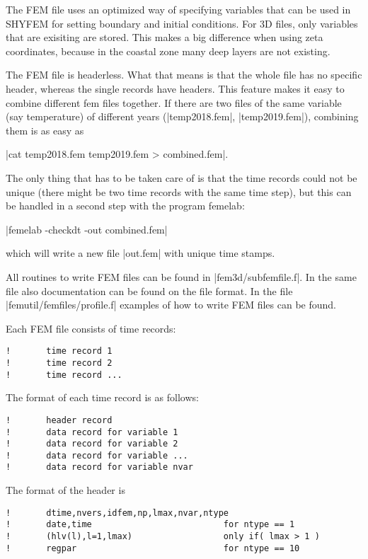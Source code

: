 The FEM file uses an optimized way of specifying variables that can be used
in SHYFEM for setting boundary and initial conditions. For 3D files, only
variables that are exisiting are stored. This makes a big difference
when using zeta coordinates, because in the coastal zone many deep
layers are not existing.

The FEM file is headerless. What that means is that the whole file
has no specific header, whereas the single records have headers. This
feature makes it easy to combine different fem files together. If there
are two files of the same variable (say temperature) of different years
(|temp2018.fem|, |temp2019.fem|), combining them is as easy as

|cat temp2018.fem temp2019.fem > combined.fem|. 

The only thing that has
to be taken care of is that the time records could not be unique (there
might be two time records with the same time step), but this
can be handled in a second step with the program femelab:

|femelab -checkdt -out combined.fem|

which will write a new file |out.fem| with unique time stamps.

All routines to write FEM files can be found in |fem3d/subfemfile.f|.
In the same file also documentation can be found on the file format.
In the file |femutil/femfiles/profile.f| examples of how to write
FEM files can be found.

Each FEM file consists of time records:

\begin{verbatim}
!       time record 1
!       time record 2
!       time record ...
\end{verbatim}

The format of each time record is as follows:

\begin{verbatim}
!       header record
!       data record for variable 1
!       data record for variable 2
!       data record for variable ...
!       data record for variable nvar
\end{verbatim}

The format of the header is

\begin{verbatim}
!       dtime,nvers,idfem,np,lmax,nvar,ntype
!       date,time                          for ntype == 1
!       (hlv(l),l=1,lmax)                  only if( lmax > 1 )
!       regpar                             for ntype == 10
\end{verbatim}

